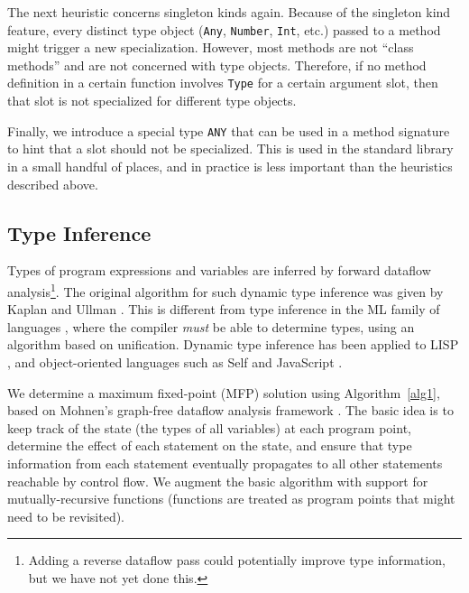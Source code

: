\documentclass[9pt]{sigplanconf}
\begin{document}
The next heuristic concerns singleton kinds again. Because of the singleton
kind feature, every distinct type object ({\tt Any}, {\tt Number}, {\tt Int},
etc.) passed to a method might trigger a new specialization. However, most
methods are not ``class methods'' and are not concerned with type objects.
Therefore, if no method definition in a certain function involves {\tt Type}
for a certain argument slot, then that slot is not specialized for different
type objects.

Finally, we introduce a special type {\tt ANY} that can be used in a method
signature to hint that a slot should not be specialized. This is used in the
standard library in a small handful of places, and in practice is less
important than the heuristics described above.


\subsection{Type Inference}

Types of program expressions and variables are inferred by forward
dataflow analysis\footnote{Adding a reverse dataflow pass could potentially
improve type information, but we have not yet done this.}.
The original algorithm for such dynamic type inference was given by
Kaplan and Ullman \cite{kaplanullman}.
This is different from type inference in the ML family of languages
\cite{MLtypeinf}, where the compiler \emph{must} be able to determine
types, using an algorithm based on unification. Dynamic type inference
has been applied to LISP \cite{TICL} \cite{pticl} \cite{nimble},
and object-oriented languages such as Self \cite{selflang} and
JavaScript \cite{typeinfjavascript}.

We determine a maximum fixed-point (MFP) solution using
Algorithm~\ref{alg1}, based on
Mohnen's graph-free dataflow analysis framework \cite{graphfree}. The basic
idea is to keep track of the state (the types of all variables) at each program
point, determine the effect of each statement on the state, and ensure that
type information from each statement eventually propagates to all other
statements reachable by control flow. We augment the basic algorithm with
support for mutually-recursive functions
(functions are treated as program points that might need to be revisited).

\end{document}

